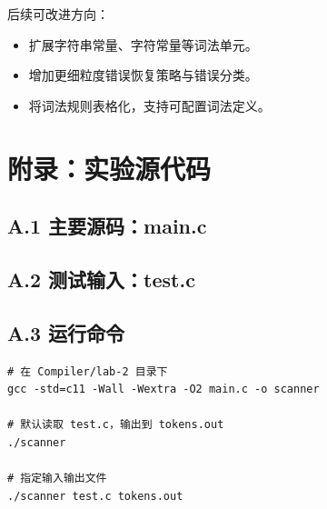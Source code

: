 \documentclass[12pt,a4paper]{ctexart}
\begin{document}
后续可改进方向：
\begin{itemize}
	\item 扩展字符串常量、字符常量等词法单元。
	\item 增加更细粒度错误恢复策略与错误分类。
	\item 将词法规则表格化，支持可配置词法定义。
\end{itemize}

\section*{附录：实验源代码}
\subsection*{A.1 主要源码：main.c}


\subsection*{A.2 测试输入：test.c}


\subsection*{A.3 运行命令}
\begin{verbatim}
# 在 Compiler/lab-2 目录下
gcc -std=c11 -Wall -Wextra -O2 main.c -o scanner

# 默认读取 test.c，输出到 tokens.out
./scanner

# 指定输入输出文件
./scanner test.c tokens.out
\end{verbatim}
\end{document}
